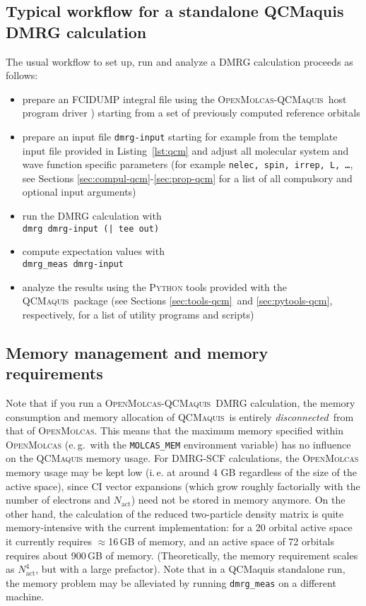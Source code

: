 \documentclass[bibliography=totoc,12pt,a4paper]{scrartcl}
\newcommand{\mol}{\textsc{OpenMolcas}}
\newcommand{\qcm}{\textsc{QCMaquis}}
\begin{document}
\subsection{Typical workflow for a standalone QCMaquis DMRG calculation}\label{sec:workflow-qcm}
The usual workflow to set up, run and analyze a DMRG calculation proceeds as follows:
\begin{itemize}
   \item prepare an FCIDUMP integral file using the \mol-\qcm\ host
   program driver \cite{interface}) starting from a set of previously computed reference orbitals
   \item prepare an input file \texttt{dmrg-input} starting for example from the template input file provided in Listing~\ref{lst:qcm} and adjust all molecular system and wave function specific parameters (for example \texttt{nelec, spin,
   irrep, L, \ldots}, see Sections \ref{sec:compul-qcm}-\ref{sec:prop-qcm} for a list of all compulsory and optional input arguments)
   \item run the DMRG calculation with\\
\texttt{dmrg dmrg-input (| tee out)}
   \item compute expectation values with\\
\texttt{dmrg\_meas dmrg-input}
   \item analyze the results using the \textsc{Python} tools provided with the \qcm\ package (see Sections \ref{sec:tools-qcm}\ and
   \ref{sec:pytools-qcm}, respectively, for a list of utility programs and scripts)
\end{itemize}

\subsection{Memory management and memory requirements}\label{sec:memory-qcm}

Note that if you run a \mol-\qcm\ DMRG calculation, the memory consumption and memory allocation
of \qcm\ is entirely \emph{disconnected}\ from that of \mol. This means that the maximum memory specified within \mol{} (e.\,g.\ with the \texttt{MOLCAS\_MEM} environment variable) has no influence on the \qcm{} memory usage. For DMRG-SCF calculations, the \mol{} memory usage may be kept low (i.\,e. at around 4 GB regardless of the size of the active space), since CI vector expansions (which grow roughly factorially with the number of electrons and $N_\text{act}$) need not be stored in memory anymore. On the other hand, the calculation of the reduced two-particle density matrix is quite memory-intensive with the current implementation: for a 20 orbital active space it currently requires $\approx$16\,GB of memory, and an active space of 72 orbitals requires about 900\,GB of memory. (Theoretically, the memory requirement scales as $N_\text{act}^4$, but with a large prefactor). Note that in a QCMaquis standalone run, the memory problem may be alleviated by running \texttt{dmrg\_meas} on a different machine.
\end{document}
